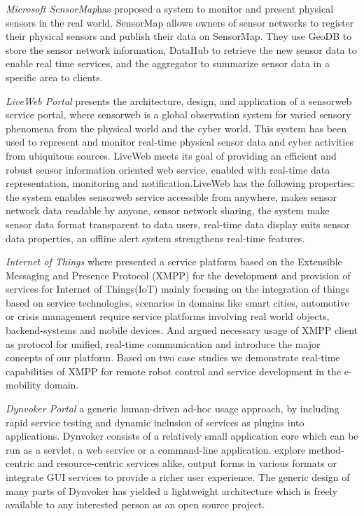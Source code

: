 	\emph{Microsoft SensorMap\cite{nath2007sensormap}}has proposed a system to monitor and present physical sensors in the real world. SensorMap allows owners of sensor networks to register their physical sensors and publish their data on SensorMap. They use GeoDB to store the sensor network information, DataHub to retrieve the new sensor data to enable real time services, and the aggregator to summarize sensor data in a specific area to clients.

	 \emph{LiveWeb Portal}\cite{yang2011liveweb} presents the architecture, design, and application of a sensorweb service portal, where sensorweb is a global observation system for varied sensory phenomena from the physical world and the cyber world. This system has been used to represent and monitor real-time physical sensor data and cyber activities from ubiquitous sources. LiveWeb meets its goal of providing an efficient and robust sensor information oriented web service, enabled with real-time data representation, monitoring and notification.LiveWeb has the following properties: the system enables sensorweb service accessible from anywhere, makes sensor network data readable by anyone, sensor network sharing, the system make sensor data format transparent to data users, real-time data display suits sensor data properties, an offline alert system strengthens real-time features.

	\emph{Internet of Things}\cite{bendel2013service} where presented a service platform based on the Extensible Messaging and Presence Protocol (XMPP) for the development and provision of services for Internet of Things(IoT) mainly focusing on the integration of things based on service technologies, scenarios in domains like smart cities, automotive or crisis management require service
	platforms involving real world objects, backend-systems and mobile devices. And argued necessary usage of
    XMPP client as protocol for unified, real-time communication and introduce the major concepts of our platform. Based on two case studies we demonstrate real-time capabilities of XMPP for remote robot control and service development in the e-mobility domain.

	 \emph{Dynvoker Portal}\cite{spillner2008ad} a generic human-driven ad-hoc usage approach, by including rapid service testing and dynamic inclusion of services as plugins into applications. Dynvoker consists of a relatively small application core which can be run as a servlet, a web service or a command-line application. explore method-centric and resource-centric services alike, output forms in various formats or integrate GUI services to provide a richer user experience. The generic design of many parts of Dynvoker has yielded a lightweight architecture which is freely available to any interested person as an open source project.

